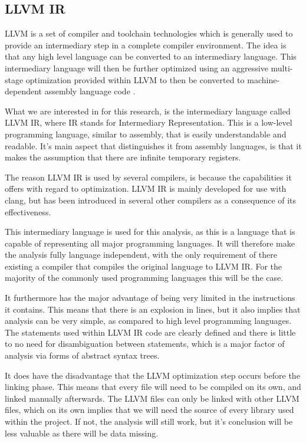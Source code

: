 \documentclass[11pt]{article}
\begin{document}
\begin{multicols}{2}
\section{LLVM IR}
LLVM  is a set of compiler and toolchain technologies which is generally used to provide an intermediary step in a complete compiler environment. The idea is that any high level language can be converted to an intermediary language. This intermediary language will then be further optimized using an aggressive multi-stage optimization provided within LLVM to then be converted to machine-dependent assembly language code \cite{lattner2002llvm}.

What we are interested in for this research, is the intermediary language called LLVM IR, where IR stands for Intermediary Representation. This is a low-level programming language, similar to assembly, that is easily understandable and readable. It's main aspect that distinguishes it from assembly languages, is that it makes the assumption that there are infinite temporary registers. 

The reason LLVM IR is used by several compilers, is because the capabilities it offers with regard to optimization. LLVM IR is mainly developed for use with clang, but has been introduced in several other compilers as a consequence of its effectiveness.

This intermediary language is used for this analysis, as this is a language that is capable of representing all major programming languages. It will therefore make the analysis fully language independent, with the only requirement of there existing a compiler that compiles the original language to LLVM IR. For the majority of the commonly used programming languages this will be the case.

It furthermore has the major advantage of being very limited in the instructions it contains. This means that there is an explosion in lines, but it also implies that analysis can be very simple, as compared to high level programming languages. The statements used within LLVM IR code are clearly defined and there is little to no need for disambiguation between statements, which is a major factor of analysis via forms of abstract syntax trees.

It does have the disadvantage that the LLVM optimization step occurs before the linking phase. This means that every file will need to be compiled on its own, and linked manually afterwards. The LLVM files can only be linked with other LLVM files, which on its own implies that we will need the source of every library used within the project. If not, the analysis will still work, but it's conclusion will be less valuable as there will be data missing.


\end{multicols}
\end{document}
